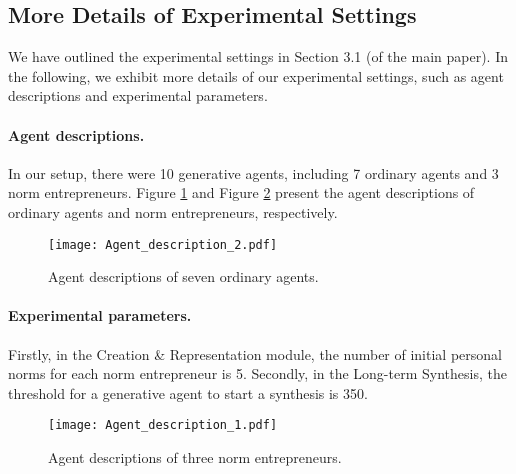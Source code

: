 \documentclass{article}
\begin{document}
\appendix
\renewcommand\thefigure{\Alph{section}\arabic{figure}}
\newpage
\onecolumn
\begin{appendices}
\section{More Details of Experimental Settings}
\setcounter{figure}{0}

We have outlined the experimental settings in Section 3.1 (of the main paper). In the following, we exhibit more details of our experimental settings, such as agent descriptions and experimental parameters.

\paragraph{Agent descriptions.} In our setup, there were 10 generative agents, including 7 ordinary agents and 3 norm entrepreneurs. Figure \ref{fig 2: agent description 2} and Figure \ref{fig 1: agent description 1} present the agent descriptions of ordinary agents and norm entrepreneurs, respectively.

\begin{figure}[H]
    \centering
    \texttt{[image: Agent\_description\_2.pdf]}
    \caption{Agent descriptions of seven ordinary agents.
    }
    \vspace{-0.3cm}
    \label{fig 2: agent description 2}
\end{figure}

\paragraph{Experimental parameters.}
Firstly, in the Creation \& Representation module, the number of initial personal norms for each norm entrepreneur is 5. Secondly, in the Long-term Synthesis, the threshold for a generative agent to start a synthesis is 350.

\begin{figure}[H]
    \centering
    \texttt{[image: Agent\_description\_1.pdf]}
    \caption{Agent descriptions of three norm entrepreneurs.
    }
    \vspace{-0.3cm}
    \label{fig 1: agent description 1}
\end{figure}
\newpage

\end{appendices}
\end{document}
